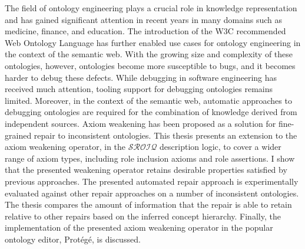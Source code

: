 The field of ontology engineering plays a crucial role in knowledge representation and has gained significant attention in recent years in many domains such as medicine, finance, and education. The introduction of the W3C recommended Web Ontology Language has further enabled use cases for ontology engineering in the context of the semantic web. With the growing size and complexity of these ontologies, however, ontologies become more susceptible to bugs, and it becomes harder to debug these defects. While debugging in software engineering has received much attention, tooling support for debugging ontologies remains limited. Moreover, in the context of the semantic web, automatic approaches to debugging ontologies are required for the combination of knowledge derived from independent sources. Axiom weakening has been proposed as a solution for fine-grained repair to inconsistent ontologies. This thesis presents an extension to the axiom weakening operator, in the $\mathcal{SROIQ}$ description logic, to cover a wider range of axiom types, including role inclusion axioms and role assertions. I show that the presented weakening operator retains desirable properties satisfied by previous approaches. The presented automated repair approach is experimentally evaluated against other repair approaches on a number of inconsistent ontologies. The thesis compares the amount of information that the repair is able to retain relative to other repairs based on the inferred concept hierarchy. Finally, the implementation of the presented axiom weakening operator in the popular ontology editor, Protégé, is discussed.
